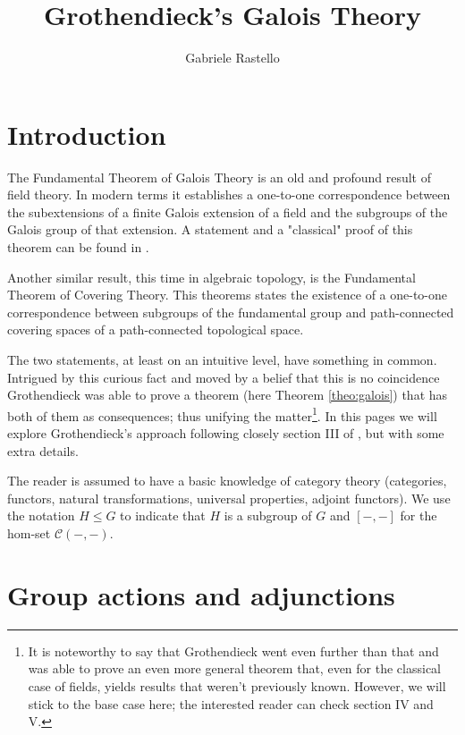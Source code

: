 \documentclass[italian, 12pt, reqno]{article}
\theoremstyle{myteo}
\numberwithin{equation}{section}
\newcommand{\cat}[1]{\mathscr{#1}}
\begin{document}
\title{Grothendieck's Galois Theory}
\author{Gabriele Rastello}
\maketitle

\tableofcontents

\section{Introduction}
\label{sec:introduction}
The Fundamental Theorem of Galois Theory is an old and profound result of field theory.
In modern terms it establishes a one-to-one correspondence between the subextensions of a finite Galois extension of a field and the subgroups of the Galois group of that extension.
A statement and a "classical" proof of this theorem can be found in \cite{lang}.

Another similar result, this time in algebraic topology, is the Fundamental Theorem of Covering Theory.
This theorems states the existence of a one-to-one correspondence between subgroups of the fundamental group and path-connected covering spaces of a path-connected topological space.

The two statements, at least on an intuitive level, have something in common.
Intrigued by this curious fact and moved by a belief that this is no coincidence Grothen\-dieck was able to prove a theorem (here Theorem \ref{theo:galois}) that has both of them as consequences; thus unifying the matter\footnote{It is noteworthy to say that Grothendieck went even further than that and was able to prove an even more general theorem that, even for the classical case of fields, yields results that weren't previously known. However, we will stick to the base case here; the interested reader can check \cite{edo} section IV and V.}.
In this pages we will explore Grothendieck's approach following closely section III of \cite{edo}, but with some extra details.

The reader is assumed to have a basic knowledge of category theory (categories, functors, natural transformations, universal properties, adjoint functors).
We use the notation \(H\leq G\) to indicate that \(H\) is a subgroup of \(G\) and \([-,-]\) for the hom-set \(\cat{C}(-, -)\).

\section{Group actions and adjunctions}
\label{sec:1}
\end{document}
